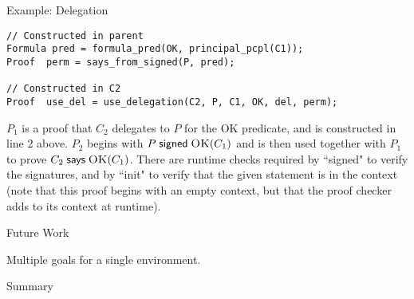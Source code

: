 \documentclass[10pt]{article}
\newcommand{\sign}[2]{\ensuremath{#1\;\textsf{signed}\;#2}}
\newcommand{\says}[2]{\ensuremath{#1\;\textsf{says}\;#2}}
\newcommand{\pred}[2]{\ensuremath{\textsc{#1}(#2)}}
\begin{document}
\begin{section}{Example: Delegation}
\begin{lstlisting}
// Constructed in parent
Formula pred = formula_pred(OK, principal_pcpl(C1));
Proof  perm = says_from_signed(P, pred);

// Constructed in C2
Proof  use_del = use_delegation(C2, P, C1, OK, del, perm);
\end{lstlisting}
$P_1$ is a proof that $C_2$ delegates to $P$ for the OK predicate, and is constructed in line 2 above.  $P_2$ begins with $\sign{P}{\pred{OK}{C_1}}$ and is then used together with $P_1$ to prove $\says{C_2}{\pred{OK}{C_1}}$.  There are runtime checks required by ``signed" to verify the signatures, and by ``init" to verify that the given statement is in the context (note that this proof begins with an empty context, but that the proof checker adds to its context at runtime).  
\end{section}

\begin{section}{Future Work}
\end{section}

Multiple goals for a single environment.
\begin{section}{Summary}
\end{section}




\end{document}
